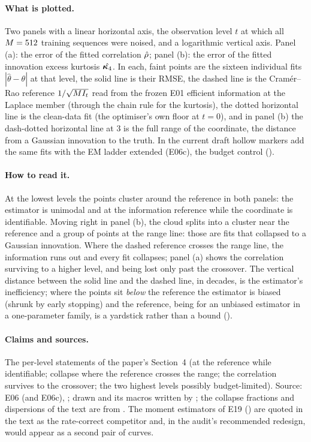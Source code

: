 \paragraph{What is plotted.} Two panels with a linear horizontal axis, the observation
level $t$ at which all $M=512$ training sequences were noised, and a logarithmic
vertical axis. Panel (a): the error of the fitted correlation $\hat{\rho}$; panel (b):
the error of the fitted innovation excess kurtosis $\hat{\bm{\kappa}_4}$. In each, faint points
are the sixteen individual fits $|\hat\theta-\theta|$ at that level, the solid line is
their RMSE, the dashed line is the Cram\'er--Rao reference $1/\sqrt{M I_t}$ read from
the frozen E01 efficient information at the Laplace member (through the chain rule for
the kurtosis), the dotted horizontal line is the clean-data fit (the optimiser's own
floor at $t=0$), and in panel (b) the dash-dotted horizontal line at $3$ is the full range
of the coordinate, the distance from a Gaussian innovation to the truth. In the current
draft hollow markers add the same fits with the EM ladder extended (E06c), the budget
control ().

\paragraph{How to read it.} At the lowest levels the points cluster around the reference
in both panels: the estimator is unimodal and at the information reference while the
coordinate is identifiable. Moving right in panel (b), the cloud splits into a cluster
near the reference and a group of points at the range line: those are fits that
collapsed to a Gaussian innovation. Where the dashed reference crosses the range line,
the information runs out and every fit collapses; panel (a) shows the correlation
surviving to a higher level, and being lost only past the crossover. The vertical
distance between the solid line and the dashed line, in decades, is the estimator's
inefficiency; where the points sit \emph{below} the reference the estimator is biased
(shrunk by early stopping) and the reference, being for an unbiased estimator in a
one-parameter family, is a yardstick rather than a bound ().

\paragraph{Claims and sources.} The per-level statements of the paper's Section~4 (at
the reference while identifiable; collapse where the reference crosses the range; the
correlation survives to the crossover; the two highest levels possibly budget-limited).
Source: E06 (and E06c), ; drawn and its macros written by
; the collapse fractions and dispersions of the
text are from . The moment estimators of E19
() are quoted in the text as the rate-correct
competitor and, in the audit's recommended redesign, would appear as a second pair of
curves.

